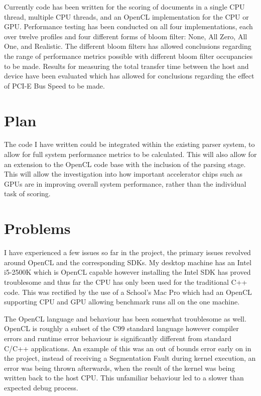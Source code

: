 \documentclass[11pt]{article}
\begin{document}
Currently code has been written for the scoring of documents in a single CPU
thread, multiple CPU threads, and an OpenCL implementation for the CPU or GPU.
Performance testing has been conducted on all four implementations, each over
twelve profiles and four different forms of bloom filter: None, All Zero, All
One, and Realistic. The different bloom filters has allowed conclusions
regarding the range of performance metrics possible with different bloom filter
occupancies to be made. Results for measuring the total transfer time between
the host and device have been evaluated which has allowed for conclusions
regarding the effect of PCI-E Bus Speed to be made.

\section*{Plan}

The code I have written could be integrated within the existing parser system,
to allow for full system performance metrics to be calculated. This will also
allow for an extension to the OpenCL code base with the inclusion of the
parsing stage. This will allow the investigation into how important accelerator
chips such as GPUs are in improving overall system performance, rather than the
individual task of scoring.

\section*{Problems}

I have experienced a few issues so far in the project, the primary issues
revolved around OpenCL and the corresponding SDKs. My desktop machine has an
Intel i5-2500K which is OpenCL capable however installing the Intel SDK has
proved troublesome and thus far the CPU has only been used for the traditional
C++ code. This was rectified by the use of a School's Mac Pro which had an
OpenCL supporting CPU and GPU allowing benchmark runs all on the one machine.

The OpenCL language and behaviour has been somewhat troublesome as well. OpenCL
is roughly a subset of the C99 standard language however compiler errors and
runtime error behaviour is significantly different from standard C/C++
applications. An example of this was an out of bounds error early on in the
project, instead of receiving a Segmentation Fault during kernel execution, an
error was being thrown afterwards, when the result of the kernel was being
written back to the host CPU. This unfamiliar behaviour led to a slower than
expected debug process.



\end{document}
